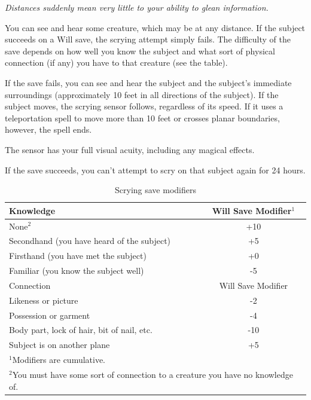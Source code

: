 \emph{Distances suddenly mean very little to your ability to glean information.}

You can see and hear some creature, which may be at any distance. 
If the subject succeeds on a Will save, the scrying attempt simply fails. 
The difficulty of the save depends on how well you know the subject and what sort of physical connection (if any) you have to that creature (see the  table). 

If the save fails, you can see and hear the subject and the subject's immediate surroundings (approximately 10 feet in all directions of the subject). 
If the subject moves, the scrying sensor follows, regardless of its speed.
If it uses a teleportation spell to move more than 10 feet or crosses planar boundaries, however, the spell ends.

The sensor has your full visual acuity, including any magical effects. %

If the save succeeds, you can't attempt to scry on that subject again for 24 hours.

\begin{table}
\caption{Scrying save modifiers}
\label{tab:Scrying}
\begin{center}
\begin{tabular}{|l|c|}
\hline
Knowledge & Will Save Modifier$^1$\\
\hline
None$^2$&+10\\
Secondhand (you have heard of the subject)&+5\\
Firsthand (you have met the subject)&+0\\
Familiar (you know the subject well)&-5\\
\hline
Connection&Will Save Modifier\\
\hline
Likeness or picture&-2\\
Possession or garment&-4\\
Body part, lock of hair, bit of nail, etc.&-10\\
Subject is on another plane&+5\\
\hline
\multicolumn{2}{l}{\small $^1$Modifiers are cumulative.}\\
\multicolumn{2}{l}{\small $^2$You must have some sort of connection to a creature you have no knowledge of.}\\
\end{tabular}
\end{center}
\end{table}

